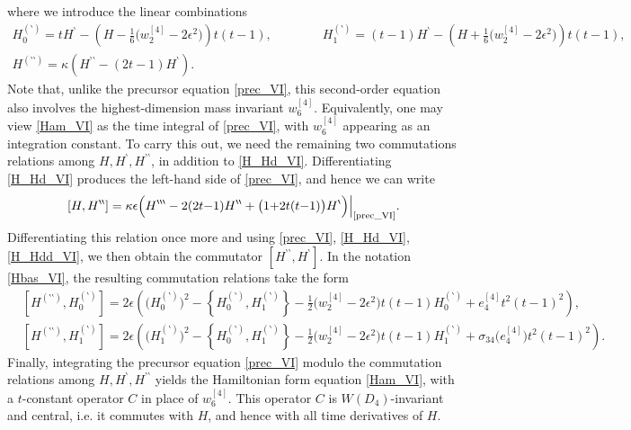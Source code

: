 \documentclass[12pt,a4paper]{article}
\numberwithin{equation}{section}
\begin{document}
where we introduce the linear combinations
\begin{multline}\label{Hbas_VI}
H_0^{(\backprime)}=tH^\backprime-\left(H-\frac16\big(w_2^{[4]}{-}2\epsilon^2\big)\right)t(t{-}1), \qquad \qquad H_1^{(\backprime)}=(t{-}1)H^\backprime-\left(H+\frac16\big(w_2^{[4]}{-}2\epsilon^2\big)\right)t(t{-}1), \\  H^{(\backprime\backprime)}=\kappa\left(H^{\backprime\backprime}-(2t{-}1)H^\backprime\right). \mspace{200mu}    
\end{multline}
Note that, unlike the precursor equation \eqref{prec_VI}, this second-order equation also involves the highest-dimension mass invariant $w_6^{[4]}$. Equivalently, one may view \eqref{Ham_VI} as the time integral of \eqref{prec_VI}, with $w_6^{[4]}$ appearing as an integration constant.  
To carry this out, we need the remaining two commutations relations among $H,H^\backprime, H^{\backprime\backprime}$, in addition to \eqref{H_Hd_VI}. Differentiating \eqref{H_Hd_VI} produces the left-hand side of \eqref{prec_VI}, and hence we can write
\begin{equation}\label{H_Hdd_VI}
[H,H^{\backprime\backprime}]=\kappa\epsilon\Big(H^{\backprime\backprime\backprime}-2(2t{-}1)H^{\backprime\backprime}+\big(1{+}2t(t{-}1)\big)H^\backprime\Big)\Big|_{\textrm{\eqref{prec_VI}}}. 
\end{equation}
Differentiating this relation once more and using \eqref{prec_VI}, \eqref{H_Hd_VI}, \eqref{H_Hdd_VI}, we then obtain the commutator $[H^{\backprime\backprime},H^\backprime]$. In the notation \eqref{Hbas_VI}, the resulting commutation relations take the form
\begin{align}\label{H2_H0}
&\left[H^{(\backprime\backprime)},H_0^{(\backprime)}\right]=2\epsilon\left(\big(H_0^{(\backprime)}\big)^2-\left\{H^{(\backprime)}_0,H^{(\backprime)}_1\right\}-\frac12\big(w_2^{[4]}{-}2\epsilon^2\big)t(t{-}1)H_0^{(\backprime)}+e_4^{[4]}t^2(t{-}1)^2\right),\\ \label{H2_H1}
&\left[H^{(\backprime\backprime)},H_1^{(\backprime)}\right]=2\epsilon\left(\big(H_1^{(\backprime)}\big)^2-\left\{H^{(\backprime)}_0,H^{(\backprime)}_1\right\}-\frac12\big(w_2^{[4]}{-}2\epsilon^2\big)t(t{-}1)H_1^{(\backprime)}+\sigma_{34}\big(e_4^{[4]}\big)t^2(t{-}1)^2\right).
\end{align}
Finally, integrating the precursor equation \eqref{prec_VI} modulo the  commutation relations among $H,H^\backprime, H^{\backprime\backprime}$ yields the Hamiltonian form equation \eqref{Ham_VI}, with a $t$-constant operator $C$ in place of $w_6^{[4]}$. This operator $C$ is $W(D_4)$-invariant and central, i.e. it commutes with $H$, and hence with all time derivatives of $H$.
\end{document}

